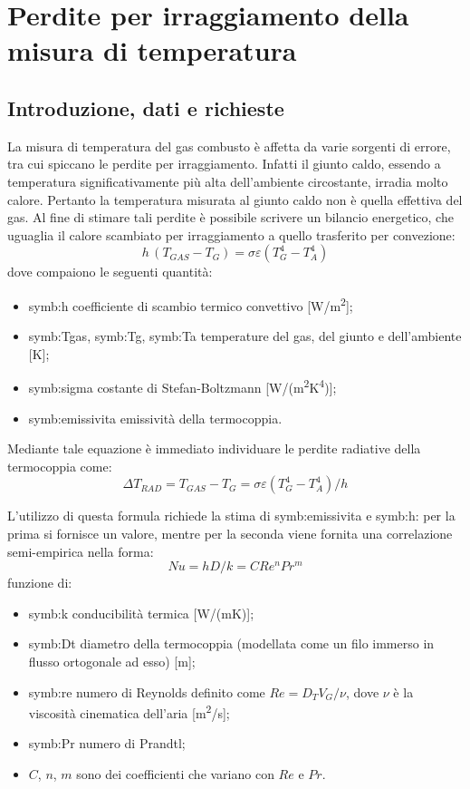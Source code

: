 \section{Perdite per irraggiamento della misura di temperatura}
\subsection{Introduzione, dati e richieste}
La misura di temperatura del gas combusto è affetta da varie sorgenti di errore, tra cui spiccano le perdite per irraggiamento. 
Infatti il giunto caldo, essendo a temperatura significativamente più alta dell'ambiente circostante, irradia molto calore. Pertanto la temperatura misurata al giunto caldo non è quella effettiva del gas. 
Al fine di stimare tali perdite è possibile scrivere un bilancio energetico, che uguaglia il calore scambiato per irraggiamento a quello trasferito per convezione: 
\begin{equation}
	h \,(T_{\textit{GAS}}-T_G) = \sigma \varepsilon (T_G^4-T_A^4)
\end{equation}
dove compaiono le seguenti quantità:
\begin{itemize}
	\item \gls{symb:h} coefficiente di scambio termico convettivo [W/m\textsuperscript{2}];
	\item \gls{symb:Tgas}, \gls{symb:Tg}, \gls{symb:Ta} temperature del gas, del giunto e dell'ambiente [K];
	\item \gls{symb:sigma} costante di Stefan-Boltzmann [W/(m\textsuperscript{2}K\textsuperscript{4})];
	\item \gls{symb:emissivita} emissività della termocoppia.
\end{itemize}

Mediante tale equazione è immediato individuare le perdite radiative della termocoppia come:
\begin{equation}
	\Delta T_{\textit{RAD}} = T_{\textit{GAS}} -T_G = \sigma \varepsilon (T_G^4-T_A^4) / h \label{eq:deltaT}
\end{equation}

L'utilizzo di questa formula richiede la stima di \gls{symb:emissivita} e \gls{symb:h}: per la prima si fornisce un valore, mentre per la seconda viene fornita una correlazione semi-empirica nella forma:
\begin{equation}
	Nu = hD/k = CRe^nPr^m
\end{equation}
funzione di:
\begin{itemize}
	\item \gls{symb:k} conducibilità termica [W/(mK)];
	\item \gls{symb:Dt} diametro della termocoppia (modellata come un filo immerso in flusso ortogonale ad esso) [m];
	\item \gls{symb:re} numero di Reynolds definito come $Re = D_T V_G/\nu$, dove $\nu$ è la viscosità cinematica dell'aria [m\textsuperscript{2}/s];
	\item \gls{symb:Pr} numero di Prandtl;
	\item $C$, $n$, $m$ sono dei coefficienti che variano con $Re$ e $Pr$.
\end{itemize}

